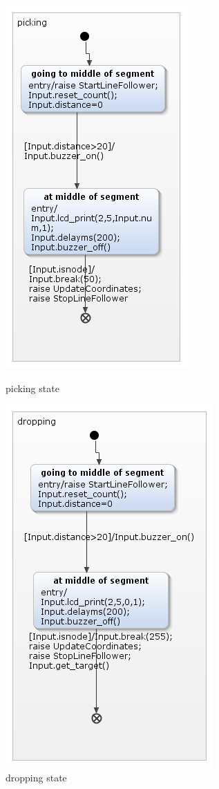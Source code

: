 \documentclass[a4paper,12pt,oneside]{book}
\begin{document}
\begin{itemize}
	\begin{figure}[]
	\begin{minipage}{0.45\textwidth}
	\includegraphics[scale=.6]{picking.png}
\caption{picking state}
	\end{minipage}
\begin{minipage}{0.45\textwidth}
	\includegraphics[scale=.6]{dropping.png}
\caption{dropping state}
\end{minipage}


\end{figure}
\end{itemize}
\end{document}
